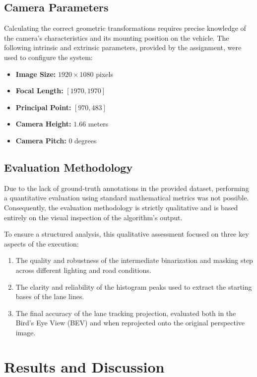 \documentclass[12pt,a4paper]{article}
\begin{document}
\subsection{Camera Parameters}
Calculating the correct geometric transformations requires precise knowledge of the camera's characteristics and its mounting position on the vehicle. The following intrinsic and extrinsic parameters, provided by the assignment, were used to configure the system:
\begin{itemize}
    \item \textbf{Image Size:} $1920 \times 1080$ pixels
    \item \textbf{Focal Length:} $[1970, 1970]$
    \item \textbf{Principal Point:} $[970, 483]$
    \item \textbf{Camera Height:} $1.66$ meters
    \item \textbf{Camera Pitch:} $0$ degrees
\end{itemize}

\subsection{Evaluation Methodology}
Due to the lack of ground-truth annotations in the provided dataset, performing a quantitative evaluation using standard mathematical metrics was not possible. Consequently, the evaluation methodology is strictly qualitative and is based entirely on the visual inspection of the algorithm's output.

To ensure a structured analysis, this qualitative assessment focused on three key aspects of the execution:
\begin{enumerate}
    \item The quality and robustness of the intermediate binarization and masking step across different lighting and road conditions.
    \item The clarity and reliability of the histogram peaks used to extract the starting bases of the lane lines.
    \item The final accuracy of the lane tracking projection, evaluated both in the Bird's Eye View (BEV) and when reprojected onto the original perspective image.
\end{enumerate}

\section{Results and Discussion}
\end{document}

